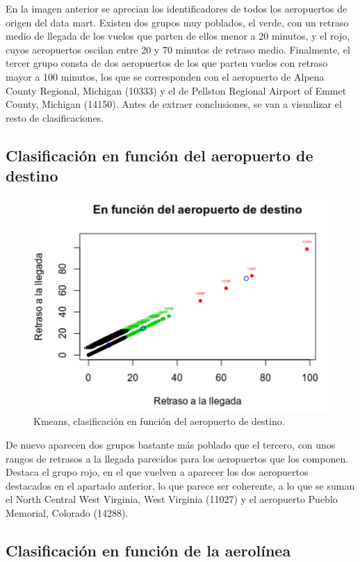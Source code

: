 \documentclass{article}
\begin{document}
En la imagen anterior se aprecian los identificadores de todos los aeropuertos de origen del data mart. Existen dos grupos muy poblados, el verde, con un retraso medio de llegada de los vuelos que parten de ellos menor a 20 minutos, y el rojo, cuyos aeropuertos oscilan entre 20 y 70 minutos de retraso medio. Finalmente, el tercer grupo consta de dos aeropuertos de los que parten vuelos con retraso mayor a 100 minutos, los que se corresponden con el aeropuerto de Alpena County Regional, Michigan (10333) y el de Pellston Regional Airport of Emmet County, Michigan (14150). Antes de extraer conclusiones, se van a visualizar el resto de clasificaciones.\\


\subsection{Clasificación en función del aeropuerto de destino}

\begin{figure}[H]
    \centering
    \includegraphics[width=0.7\columnwidth]{images/KMEANS/Destino.png}
    \caption{Kmeans, clasificación en función del aeropuerto de destino. }
    \label{fig:dest}
\end{figure}

De nuevo aparecen dos grupos bastante más poblado que el tercero, con unos rangos de retrasos a la llegada parecidos para los aeropuertos que los componen. Destaca el grupo rojo, en el que vuelven a aparecer los dos aeropuertos destacados en el apartado anterior, lo que parece ser coherente, a lo que se suman el North Central West Virginia, West Virginia (11027) y el aeropuerto Pueblo Memorial, Colorado (14288).\\


\subsection{Clasificación en función de la aerolínea}
\end{document}
